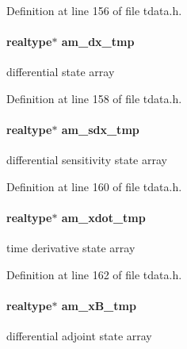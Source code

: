 Definition at line 156 of file tdata.\+h.

\hypertarget{struct_temp_data_abd683baa60bb69c9731961ba50e1455d}{}
\paragraph[{am\+\_\+dx\+\_\+tmp}]{\setlength{\rightskip}{0pt plus 5cm}realtype$\ast$ am\+\_\+dx\+\_\+tmp}\label{struct_temp_data_abd683baa60bb69c9731961ba50e1455d}
differential state array 

Definition at line 158 of file tdata.\+h.

\hypertarget{struct_temp_data_ac0bc306224fbe129accbc959efda5451}{}
\paragraph[{am\+\_\+sdx\+\_\+tmp}]{\setlength{\rightskip}{0pt plus 5cm}realtype$\ast$ am\+\_\+sdx\+\_\+tmp}\label{struct_temp_data_ac0bc306224fbe129accbc959efda5451}
differential sensitivity state array 

Definition at line 160 of file tdata.\+h.

\hypertarget{struct_temp_data_ac28b5a5a19ad2004d32d20098d3603ed}{}
\paragraph[{am\+\_\+xdot\+\_\+tmp}]{\setlength{\rightskip}{0pt plus 5cm}realtype$\ast$ am\+\_\+xdot\+\_\+tmp}\label{struct_temp_data_ac28b5a5a19ad2004d32d20098d3603ed}
time derivative state array 

Definition at line 162 of file tdata.\+h.

\hypertarget{struct_temp_data_a71147dc6b9970cafbada503f873d0dfe}{}
\paragraph[{am\+\_\+x\+B\+\_\+tmp}]{\setlength{\rightskip}{0pt plus 5cm}realtype$\ast$ am\+\_\+x\+B\+\_\+tmp}\label{struct_temp_data_a71147dc6b9970cafbada503f873d0dfe}
differential adjoint state array 

